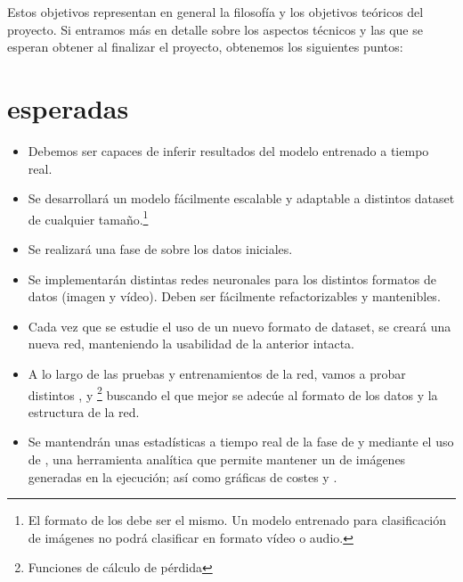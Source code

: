 Estos objetivos representan en general la filosofía y los objetivos teóricos del proyecto. Si entramos más en detalle sobre los aspectos técnicos y las  que se esperan obtener al finalizar el proyecto, obtenemos los siguientes puntos:

\section{ esperadas}

\begin{itemize}
  \item Debemos ser capaces de inferir resultados del modelo entrenado a tiempo real.
  \item Se desarrollará un modelo fácilmente escalable y adaptable a distintos dataset de cualquier tamaño.\footnote{El formato de los  debe ser el mismo. Un modelo entrenado para clasificación de imágenes no podrá clasificar en formato vídeo o audio.}
  \item Se realizará una fase de  sobre los datos iniciales.
  \item Se implementarán distintas redes neuronales para los distintos formatos de datos (imagen y vídeo). Deben ser fácilmente refactorizables y mantenibles.
  \item Cada vez que se estudie el uso de un nuevo formato de dataset, se creará una nueva red, manteniendo la usabilidad de la anterior intacta.
  \item A lo largo de las pruebas y entrenamientos de la red, vamos a probar distintos ,  y \footnote{Funciones de cálculo de pérdida} buscando el que mejor se adecúe al formato de los datos y la estructura de la red.
  \item Se mantendrán unas estadísticas a tiempo real de la fase de  y  mediante el uso de , una herramienta analítica que permite mantener un  de imágenes generadas en la ejecución; así como gráficas de costes y .
\end{itemize}
